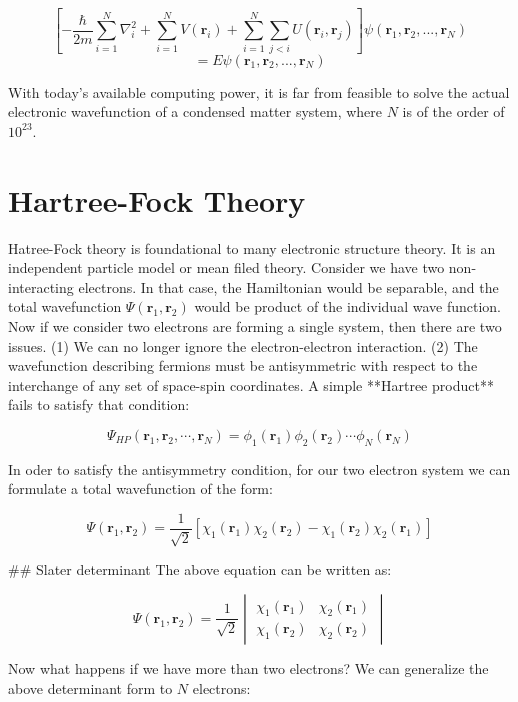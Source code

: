 \documentclass{article}
\begin{document}
$$\left[-\frac{\hbar}{2m} \sum_{i=1}^N \nabla_i^2 + \sum_{i=1}^NV(\textbf{r}_i)
+ \sum_{i=1}^N \sum_{j<i}U(\textbf{r}_i, \textbf{r}_j)\right]\psi(\textbf{r}_1,
\textbf{r}_2, ..., \textbf{r}_N)$$
$$= E\psi(\textbf{r}_1, \textbf{r}_2, ...,
\textbf{r}_N)$$

With today's available computing power, it is far from feasible to solve the
actual electronic wavefunction of a condensed matter system, where $N$ is of the
order of $10^{23}$.

\section{Hartree-Fock Theory}

Hatree-Fock theory is foundational to many electronic structure theory. It is an
independent particle model or mean filed theory. Consider we have two
non-interacting electrons. In that case, the Hamiltonian would be separable, and
the total wavefunction $\Psi(\textbf{r}_1, \textbf{r}_2)$ would be product of
the individual wave function. Now if we consider two electrons are forming a
single system, then there are two issues. (1) We can no longer ignore the
electron-electron interaction. (2) The wavefunction describing fermions must be
antisymmetric with respect to the interchange of any set of space-spin
coordinates. A simple **Hartree product** fails to satisfy that condition:

$$
\Psi_{HP}(\textbf{r}_1, \textbf{r}_2, \cdots, \textbf{r}_N) =
\phi_1(\textbf{r}_1) \phi_2(\textbf{r}_2) \cdots \phi_N(\textbf{r}_N)
$$

In oder to satisfy the antisymmetry condition, for our two electron system we
can formulate a total wavefunction of the form:

$$
\Psi(\textbf{r}_1, \textbf{r}_2) = \frac{1}{\sqrt{2}} [\chi_1(\textbf{r}_1)
\chi_2(\textbf{r}_2) - \chi_1(\textbf{r}_2)\chi_2(\textbf{r}_1)]
$$

## Slater determinant
The above equation can be written as:

$$
\Psi(\textbf{r}_1, \textbf{r}_2) = \frac{1}{\sqrt{2}}
\begin{vmatrix}
\chi_1(\textbf{r}_1) & \chi_2(\textbf{r}_1) \\
\chi_1(\textbf{r}_2) & \chi_2(\textbf{r}_2)
\end{vmatrix}
$$

Now what happens if we have more than two electrons? We can generalize the above
determinant form to $N$ electrons:
\end{document}
